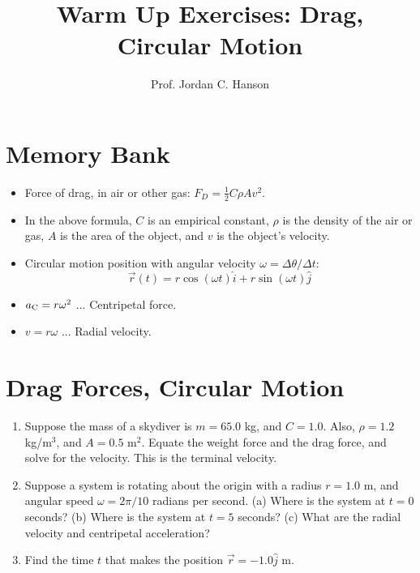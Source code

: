 \documentclass{article}
\begin{document}
\title{Warm Up Exercises: Drag, Circular Motion}
\author{Prof. Jordan C. Hanson}

\maketitle

\section{Memory Bank}

\begin{itemize}
\item Force of drag, in air or other gas: $F_D = \frac{1}{2}C \rho A v^2$.
\item In the above formula, $C$ is an empirical constant, $\rho$ is the density of the air or gas, $A$ is the area of the object, and $v$ is the object's velocity.
\item Circular motion position with angular velocity $\omega = \Delta \theta / \Delta t$:
\begin{equation}
\vec{r}(t) = r\cos(\omega t)\hat{i} + r\sin(\omega t)\hat{j}
\end{equation}
\item $a_{\rm C} = r \omega^2$ ... Centripetal force.
\item $v = r\omega$ ... Radial velocity.
\end{itemize}



\section{Drag Forces, Circular Motion}
\begin{enumerate}
\item Suppose the mass of a skydiver is $m = 65.0$ kg, and $C = 1.0$.  Also, $\rho = 1.2$ kg/m$^3$, and $A = 0.5$ m$^2$.  Equate the weight force and the drag force, and solve for the velocity.  This is the terminal velocity. \\ \vspace{1cm}
\item Suppose a system is rotating about the origin with a radius $r = 1.0$ m, and angular speed $\omega = 2\pi/10$ radians per second. (a) Where is the system at $t = 0$ seconds?  (b) Where is the system at $t=5$ seconds? (c) What are the radial velocity and centripetal acceleration? \\ \vspace{2cm}
\item Find the time $t$ that makes the position $\vec{r} = -1.0\hat{j}$ m.
\end{enumerate}
\end{document}
